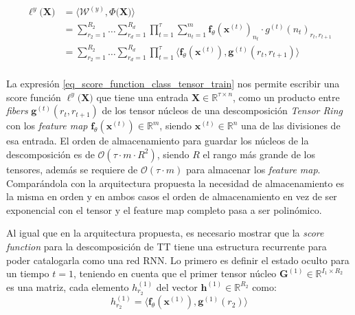 \documentclass[spanish]{article}
\theoremstyle{definition}
\theoremstyle{remark}
\numberwithin{equation}{section}
\numberwithin{equation}{section} %
\begin{document}
\begin{equation}
\label{eq_score_function_class_tensor_train}
\begin{split}
\ell^y\big(\boldsymbol{X}\big) & 
=\Bigg\langle \mathcal{W}^{(y)} , \mathit{\Phi}\Big(\boldsymbol{X}\Big) \Bigg\rangle 
 \\ &
 =\sum^{R_2}_{r_2=1}\ldots\sum^{R_d}_{r_d=1}\prod^\tau_{t=1}\sum^{m}_{n_t=1} \boldsymbol{f}_\theta(\boldsymbol{x}^{(t)})_{n_t} \cdot g^{(t)}(n_t)_{r_t,r_{t+1}}
  \\ &
 =\sum^{R_2}_{r_2=1}\ldots\sum^{R_d}_{r_d=1}\prod^\tau_{t=1}\langle \boldsymbol{f}_\theta(\boldsymbol{x}^{(t)}),\boldsymbol{g}^{(t)}(r_t,r_{t+1}) \rangle
 \\
\end{split}
\end{equation} \par
La expresión \eqref{eq_score_function_class_tensor_train} nos permite escribir una score función $\ell^y\big(\boldsymbol{X}\big)$ que tiene una entrada $\boldsymbol{X} \in \mathbb{R}^{\tau \times n}$, como un producto entre \textit{fibers} $\boldsymbol{g}^{(t)}(r_t,r_{t+1})$ de los tensor núcleos de una descomposición \textit{Tensor Ring} con los \textit{feature map} $\boldsymbol{f}_\theta(\boldsymbol{x}^{(t)}) \in \mathbb{R}^{m}$, siendo $\boldsymbol{x}^{(t)} \in \mathbb{R}^{n}$ una de las divisiones de esa entrada. El orden de almacenamiento para guardar los núcleos de la descomposición es de $\mathcal{O}(\tau \cdot m \cdot R^2)$, siendo $R$ el rango más grande de los tensores, además se requiere de $\mathcal{O}(\tau \cdot m)$ para almacenar los \textit{feature map}. Comparándola con la arquitectura propuesta la necesidad de almacenamiento es la misma en orden y  en ambos casos el orden de almacenamiento en vez de ser exponencial con el tensor y el feature map completo pasa a ser polinómico.\par
Al igual que en la arquitectura propuesta, es necesario mostrar que la \textit{score function} para la descomposición de TT tiene una estructura recurrente para poder catalogarla como una red RNN. Lo primero es definir el estado oculto para un tiempo $t=1$, teniendo en cuenta que el primer tensor núcleo $\boldsymbol{G}^{(1)} \in \mathbb{R}^{I_1 \times R_{2}}$ es una matriz, cada elemento $h^{(1)}_{r_2}$ del vector $\boldsymbol{h}^{(1)} \in \mathbb{R}^{R_2} $ como:
\begin{equation}
\label{eq_first_hidden_state_tensor_train_rnn}
h^{(1)}_{r_2} 
= \langle \boldsymbol{f}_\theta(\boldsymbol{x}^{(1)}),\boldsymbol{g}^{(1)}(r_2) \rangle
\end{equation} \par
\end{document}
